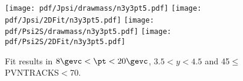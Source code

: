 \begin{figure}[H]
\begin{center}
\texttt{[image: pdf/Jpsi/drawmass/n3y3pt5.pdf]}
\texttt{[image: pdf/Jpsi/2DFit/n3y3pt5.pdf]}
\vspace*{-0.5cm}
\texttt{[image: pdf/Psi2S/drawmass/n3y3pt5.pdf]}
\texttt{[image: pdf/Psi2S/2DFit/n3y3pt5.pdf]}
\vspace*{-0.5cm}
\end{center}
\caption{Fit results in $8\gevc<\pt<20\gevc$, $3.5<y<4.5$ and 45$\leq$PVNTRACKS$<$70.}
\label{Fitn3y3pt5}
\end{figure}

